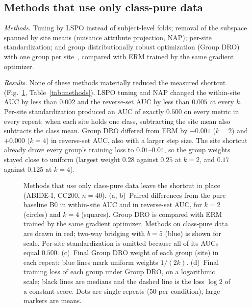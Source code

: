 \subsection{Methods that use only class-pure data}

\emph{Methods.} Tuning by LSPO instead of subject-level folds; removal of the subspace spanned by site means (nuisance attribute projection, NAP); per-site standardization; and group distributionally robust optimization (Group DRO) with one group per site~\cite{sagawa2020}, compared with ERM trained by the same gradient optimizer.

\emph{Results.} None of these methods materially reduced the measured shortcut (Fig.~\ref{fig:pureonly}, Table~\ref{tab:methods}). LSPO tuning and NAP changed the within-site AUC by less than $0.002$ and the reverse-set AUC by less than $0.005$ at every $k$. Per-site standardization produced an AUC of exactly $0.500$ on every metric in every repeat: when each site holds one class, subtracting the site mean also subtracts the class mean. Group DRO differed from ERM by $-0.001$ ($k=2$) and $+0.000$ ($k=4$) in reverse-set AUC, also with a larger step size. The site shortcut already drove every group's training loss to $0.01$--$0.04$, so the group weights stayed close to uniform (largest weight $0.28$ against $0.25$ at $k=2$, and $0.17$ against $0.125$ at $k=4$).

\begin{figure}[tbp]
\centering
{}
\caption{Methods that use only class-pure data leave the shortcut in place (ABIDE-I, CC200, $n=40$). (a, b)~Paired differences from the pure baseline B0 in within-site AUC and in reverse-set AUC, for $k=2$ (circles) and $k=4$ (squares). Group DRO is compared with ERM trained by the same gradient optimizer. Methods on class-pure data are drawn in red; two-way bridging with $b=5$ (blue) is shown for scale. Per-site standardization is omitted because all of its AUCs equal $0.500$. (c)~Final Group DRO weight of each group (site) in each repeat; blue lines mark uniform weights $1/(2k)$. (d)~Final training loss of each group under Group DRO, on a logarithmic scale; black lines are medians and the dashed line is the loss $\log 2$ of a constant score. Dots are single repeats ($50$ per condition), large markers are means.}
\label{fig:pureonly}
\end{figure}

